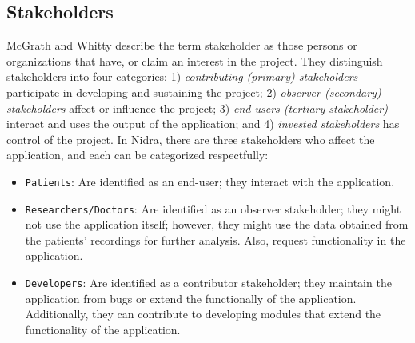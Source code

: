 \subsection{Stakeholders}
McGrath and Whitty \cite{stakeholderdefined} describe the term stakeholder as those persons or organizations that have, or claim an interest in the project. They distinguish stakeholders into four categories: 1) \textit{contributing (primary) stakeholders} participate in developing and sustaining the project; 2) \textit{observer (secondary) stakeholders} affect or influence the project;  3) \textit{end-users (tertiary stakeholder)} interact and uses the output of the application; and 4) \textit{invested stakeholders} has control of the project. In Nidra, there are three stakeholders who affect the application, and each can be categorized respectfully:
\begin{itemize}
    \item \verb|Patients|: Are identified as an end-user; they interact with the application.  
    \item \verb|Researchers/Doctors|: Are identified as an observer stakeholder; they might not use the application itself; however, they might use the data obtained from the patients' recordings for further analysis. Also, request functionality in the application.
    \item \verb|Developers|: Are identified as a contributor stakeholder; they maintain the application from bugs or extend the functionally of the application. Additionally, they can contribute to developing modules that extend the functionality of the application. 
\end{itemize}